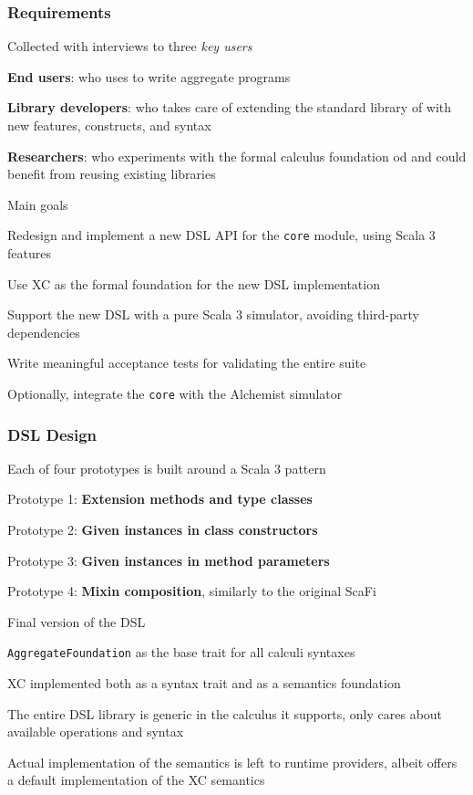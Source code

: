 \begin{frame}[allowframebreaks]
    \frametitle{Requirements}
    \begin{blockitems}{Collected with interviews to three \textit{key users}}
        \item \textbf{End users}: who uses \this to write aggregate programs
        \item \textbf{Library developers}: who takes care of extending the standard library of \this with new features, constructs, and syntax
        \item \textbf{Researchers}: who experiments with the formal calculus foundation od \this and could benefit from reusing existing libraries
    \end{blockitems}
    \begin{blockitems}{Main goals}
        \item Redesign and implement a new \ac{DSL} \ac{API} for the \texttt{core} module, using Scala 3 features
        \item Use \ac{XC} as the formal foundation for the new \ac{DSL} implementation
        \item Support the new \ac{DSL} with a pure Scala 3 simulator, avoiding third-party dependencies
        \item Write meaningful acceptance tests for validating the entire suite
        \item Optionally, integrate the \texttt{core} with the Alchemist simulator
    \end{blockitems}
\end{frame}

\begin{frame}
    \frametitle{\ac{DSL} Design}
    \begin{blockitems}{Each of four prototypes is built around a Scala 3 pattern}
        \item Prototype 1: \textbf{Extension methods and type classes}
        \item Prototype 2: \textbf{Given instances in class constructors}
        \item Prototype 3: \textbf{Given instances in method parameters}
        \item Prototype 4: \textbf{Mixin composition}, similarly to the original ScaFi
    \end{blockitems}
    \begin{blockitems}{Final version of the \ac{DSL}}
        \item \texttt{AggregateFoundation} as the base trait for all calculi syntaxes
        \item \ac{XC} implemented both as a syntax trait and as a semantics foundation
        \item The entire \ac{DSL} library is generic in the calculus it supports, only cares about available operations and syntax
        \item Actual implementation of the semantics is left to runtime providers, albeit \this offers a default implementation of the \ac{XC} semantics
    \end{blockitems}
\end{frame}

